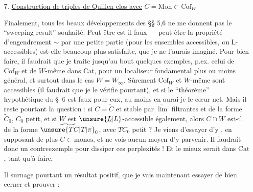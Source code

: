 
7. \uline{Construction de triples de Quillen clos avec} $C=\mathrm{Mon}\subset\mathrm{Cof}_W$

Finalement, tous les beaux développements des §§ 5,6 ne me donnent pas le ``sweeping result'' souhaité. Peut-être est-il faux --- peut-être la propriété d'engendrement $\sim$ par une petite partie (pour les ensembles accessibles, ou L-accessibles) est-elle beaucoup plus  satisfaite, que je ne l'aurais imaginé. Pour bien faire, il faudrait que je traite jusqu'au
bout quelques exemples, p.ex. celui de $\mathrm{Cof}_{W}$ et de $W$-même dans $\mathrm{Cat}$, pour un localiseur fondamental plus ou moins général, et surtout dans le cas $W=W_\infty$. Sûrement $\mathrm{Cof}_{W}$ et $W$-même sont accessibles (il faudrait que je le vérifie pourtant), et si le ``théorème'' hypothétique du \S~6 est faux pour eux, au moins en aurai-je le cœur net. Mais il reste pourtant la question : si $C=\widetilde C$ et stable par $\underrightarrow{\lim}$ filtrantes et de la forme $\widetilde C_0$, $C_0$ petit, et si $W$ est $\unsure{\underline L|L}$-accessible également, alors $C\cap W$ est-il  de la forme $\widetilde{\unsure{TC|T|\pi}}_0$, avec $TC_0$ petit ? Je viens  d'essayer d'y , en supposant de plus $C\subset\mathrm{monos}$, et ne vois aucun moyen d'y parvenir. Il faudrait donc un contreexemple pour dissiper ces perplexités ! Et le mieux serait dans $\mathrm{Cat}$, tant qu'à faire.

Il surnage pourtant un résultat  positif, que je vais maintenant essayer de bien cerner et prouver :
